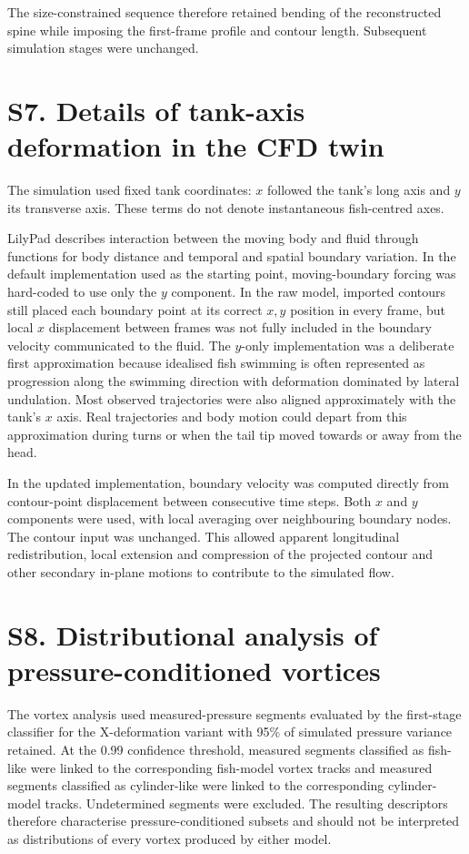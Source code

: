 \documentclass[11pt,a4paper]{article}
\begin{document}
The size-constrained sequence therefore retained bending of the reconstructed spine while imposing the first-frame profile and contour length. Subsequent simulation stages were unchanged.

\section*{S7. Details of tank-axis deformation in the CFD twin}

The simulation used fixed tank coordinates: $x$ followed the tank's long axis and $y$ its transverse axis. These terms do not denote instantaneous fish-centred axes.

LilyPad describes interaction between the moving body and fluid through functions for body distance and temporal and spatial boundary variation. In the default implementation used as the starting point, moving-boundary forcing was hard-coded to use only the $y$ component. In the raw model, imported contours still placed each boundary point at its correct $x,y$ position in every frame, but local $x$ displacement between frames was not fully included in the boundary velocity communicated to the fluid. The $y$-only implementation was a deliberate first approximation because idealised fish swimming is often represented as progression along the swimming direction with deformation dominated by lateral undulation. Most observed trajectories were also aligned approximately with the tank's $x$ axis. Real trajectories and body motion could depart from this approximation during turns or when the tail tip moved towards or away from the head.

In the updated implementation, boundary velocity was computed directly from contour-point displacement between consecutive time steps. Both $x$ and $y$ components were used, with local averaging over neighbouring boundary nodes. The contour input was unchanged. This allowed apparent longitudinal redistribution, local extension and compression of the projected contour and other secondary in-plane motions to contribute to the simulated flow.

\section*{S8. Distributional analysis of pressure-conditioned vortices}

The vortex analysis used measured-pressure segments evaluated by the first-stage classifier for the X-deformation variant with 95\% of simulated pressure variance retained. At the 0.99 confidence threshold, measured segments classified as fish-like were linked to the corresponding fish-model vortex tracks and measured segments classified as cylinder-like were linked to the corresponding cylinder-model tracks. Undetermined segments were excluded. The resulting descriptors therefore characterise pressure-conditioned subsets and should not be interpreted as distributions of every vortex produced by either model.
\end{document}
